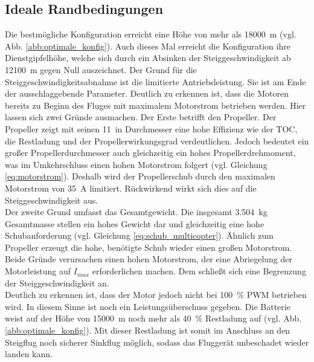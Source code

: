 \subsection{Ideale Randbedingungen}
\label{subsec:ideale_rb}
Die bestmögliche Konfiguration erreicht eine Höhe von  mehr als \SI{18000}{m} (vgl. Abb. \ref{abb:optimale_konfig}). Auch dieses Mal erreicht die Konfiguration ihre Dienstgipfelhöhe, welche sich durch ein Absinken der Steiggeschwindigkeit ab \SI{12100}{m} gegen Null auszeichnet. Der Grund für die Steiggeschwindigkeitsabnahme ist die limitierte Antriebsleistung. Sie ist am Ende der ausschlaggebende Parameter. Deutlich zu erkennen ist, dass die Motoren bereits zu Beginn des Fluges mit maximalem Motorstrom betrieben werden. Hier lassen sich zwei Gründe ausmachen.
Der Erste betrifft den Propeller. Der Propeller zeigt mit seinen \SI{11}{in} Durchmesser eine hohe Effizienz wie der TOC, die Restladung und der Propellerwirkungsgrad verdeutlichen. Jedoch bedeutet ein großer Propellerdurchmesser auch gleichzeitig ein hohes Propellerdrehmoment, was im Umkehrschluss einen hohen Motorstrom folgert (vgl. Gleichung \eqref{eq:motorstrom}). Deshalb wird der Propellerschub durch den maximalen Motorstrom von \SI{35}{A} limitiert. Rückwirkend wirkt sich dies auf die Steiggeschwindigkeit aus. \\
Der zweite Grund umfasst das Gesamtgewicht. Die insgesamt \SI{3,504}{kg} Gesamtmasse stellen ein hohes Gewicht dar und gleichzeitig eine hohe Schubanforderung (vgl. Gleichung \eqref{eq:schub_multicopter}). Ähnlich zum Propeller erzeugt die hohe, benötigte Schub wieder einen großen Motorstrom. \\
Beide Gründe verursachen einen hohen Motorstrom, der eine Abriegelung der Motorleistung auf \ensuremath{I_{max}} erforderlichen machen. Dem schließt sich eine Begrenzung der Steiggeschwindigkeit an. \\
Deutlich zu erkennen ist, dass der Motor jedoch nicht bei \SI{100}{\%} PWM betrieben wird. In diesem Sinne ist noch ein Leistungsüberschuss gegeben.
Die Batterie weist auf der Höhe von \SI{15000}{m} noch mehr als \SI{40}{\%} Restladung auf (vgl. Abb. \ref{abb:optimale_konfig}). Mit dieser Restladung ist somit im Anschluss an den Steigflug noch sicherer Sinkflug möglich, sodass das Fluggerät unbeschadet wieder landen kann.

